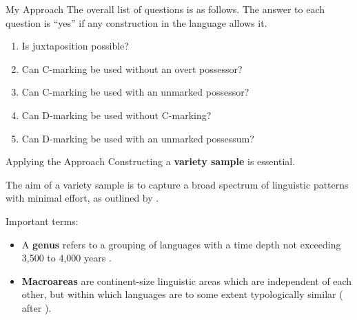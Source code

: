 \documentclass[12pt,aspectratio=169,t]{beamer}
\renewcommand{\'}{\textquotesingle}
\begin{document}
\begin{frame}{My Approach}
	The overall list of questions is as follows. The answer to each question is ``yes'' if any construction in the language allows it.
	
	\begin{enumerate}
		\item Is juxtaposition possible?
		\item Can C-marking be used without an overt possessor?
		\item Can C-marking be used with an unmarked possessor?
		\item Can D-marking be used without C-marking?
		\item Can D-marking be used with an unmarked possessum?
	\end{enumerate}
\end{frame}

\begin{frame}{Applying the Approach}
	Constructing a \textbf{variety sample} is essential.
	
	\pause
	The aim of a variety sample is to capture a broad spectrum of linguistic patterns with minimal effort, as outlined by \cite{miestamo2016sampling}.
	
	\pause
	
	Important terms:
	
	\vspace{-0.7em}
	\begin{itemize}
		\item A \textbf{genus} refers to a grouping of languages with a time depth not exceeding 3,500 to 4,000 years \citep{dryer1989large}.
		\item \textbf{Macroareas} are continent-size linguistic areas
		which are independent of each other, but within which languages are to some
		extent typologically similar (\citealt{miestamo2016sampling} after \citealt{dryer1989large}).
	\end{itemize}
\end{frame}
\end{document}

